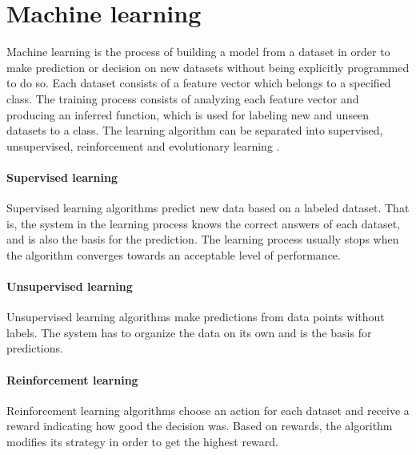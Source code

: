 \documentclass[USenglish]{ifimaster}  %
\begin{document}


\section{Machine learning}
Machine learning is the process of building a model from a dataset in order to make prediction or decision on new datasets without being explicitly programmed to do so. Each dataset consists of a feature vector which belongs to a specified class. The training process consists of analyzing each feature vector and producing an inferred function, which is used for labeling new and unseen datasets to a class. The learning algorithm can be separated into supervised, unsupervised, reinforcement and evolutionary learning \cite{Marsland:2009:MLA:1571643}.

\paragraph{Supervised learning}
Supervised learning algorithms predict new data based on a labeled dataset. That is, the system in the learning process knows the correct answers of each dataset, and is also the basis for the prediction. The learning process usually stops when the algorithm converges towards an acceptable level of performance.
	
\paragraph{Unsupervised learning}
Unsupervised learning algorithms make predictions from data points without labels. The system has to organize the data on its own and is the basis for predictions. 
	
\paragraph{Reinforcement learning}
Reinforcement learning algorithms choose an action for each dataset and receive a reward indicating how good the decision was. Based on rewards, the algorithm modifies its strategy in order to get the highest reward.  
	
\end{document}
